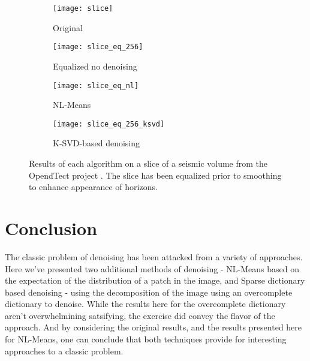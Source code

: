 \documentclass[11pt]{article}
\begin{document}
\begin{figure}
\centering
\graphicspath{{images/}}
\begin{subfigure}[b]{0.5\textwidth}
\centering
\texttt{[image: slice]}
\caption{Original}
\label{slice:original}
\end{subfigure}
\begin{subfigure}[b]{0.5\textwidth}
\centering
\texttt{[image: slice\_eq\_256]}
\caption{Equalized no denoising}
\label{slice:noise}
\end{subfigure}
\begin{subfigure}[b]{0.5\textwidth}
\centering
\texttt{[image: slice\_eq\_nl]}
\caption{NL-Means}
\label{slice:nl}
\end{subfigure}
\begin{subfigure}[b]{0.5\textwidth}
\centering
\texttt{[image: slice\_eq\_256\_ksvd]}
\caption{K-SVD-based denoising}
\label{slice:ksvd}
\end{subfigure}
\caption{Results of each algorithm on a slice of a seismic volume from the OpendTect project \cite{opendTectWeb}. The slice has been equalized prior to smoothing to enhance appearance of horizons.}
\label{fig:slice:dn}
\end{figure}


\section{Conclusion}

The classic problem of denoising has been attacked from a variety of approaches.
Here we've presented two additional methods of denoising - NL-Means based on the expectation of the distribution of a patch in the image, and Sparse dictionary based denoising - using the decomposition of the image using an overcomplete dictionary to denoise.
While the results here for the overcomplete dictionary aren't overwhelmining satsifying, the exercise did convey the flavor of the approach.
And by considering the original results, and the results presented here for NL-Means, one can conclude that both techniques provide for interesting approaches to a classic problem.



\end{document}
